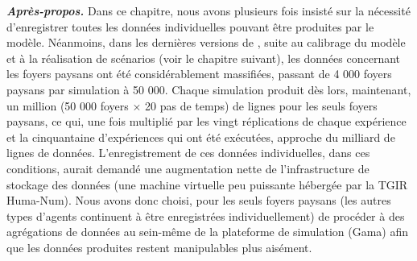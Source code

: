 \vfill
{}
\begin{mdframed}[backgroundcolor=black!5,footnoteinside=false]
	\textbf{\textit{Après-propos.}}
Dans ce chapitre, nous avons plusieurs fois insisté sur la nécessité d'enregistrer toutes les données individuelles pouvant être produites par le modèle.
Néanmoins, dans les dernières versions de \simfeodal{}, suite au calibrage du modèle et à la réalisation de scénarios (voir le chapitre suivant), les données concernant les foyers paysans ont été considérablement massifiées, passant de 4 000 foyers paysans par simulation à 50 000.
Chaque simulation produit dès lors, maintenant, un million (50 000 foyers × 20 pas de temps) de lignes pour les seuls foyers paysans, ce qui, une fois multiplié par les vingt réplications de chaque expérience et la cinquantaine d'expériences qui ont été exécutées, approche du milliard de lignes de données.
L'enregistrement de ces données individuelles, dans ces conditions, aurait demandé une augmentation nette de l'infrastructure de stockage des données (une machine virtuelle peu puissante hébergée par la TGIR Huma-Num).
Nous avons donc choisi, pour les seuls foyers paysans (les autres types d'agents continuent à être enregistrées individuellement) de procéder à des agrégations de données au sein-même de la plateforme de simulation (Gama) afin que les données produites restent manipulables plus aisément.
\end{mdframed}
